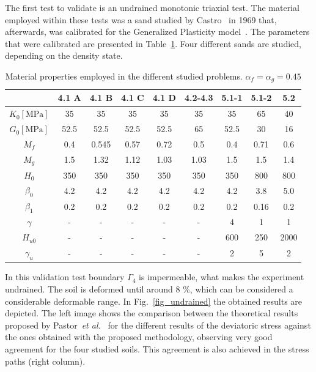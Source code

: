 \documentclass[preprint,12pt,a4paper]{elsarticle}
\begin{document}
The first test to validate is an undrained monotonic triaxial test. The material employed within these tests was a sand studied by Castro~\cite{Castro69} in 1969 that, afterwards, was calibrated for the Generalized Plasticity model~\cite{PastorZC:90,Zienkiewicz99}. The parameters that were calibrated are presented in Table~\ref{tab3}. Four different sands are studied, depending on the density state.

\begin{table}
\caption{\label{tab3} Material properties employed in the different studied problems. $\alpha_f=\alpha_g=0.45$} 
\centering
	\begin{tabular}{c|c|c|c|c|c|c|c|c}
	& 4.1 A  & 4.1 B & 4.1 C & 4.1 D & 4.2-4.3 & 5.1-1 & 5.1-2 & 5.2 \\
	\hline
        $K_{0} \left[ \text{MPa} \right]$  & 35 & 35 & 35 & 35 & 35 & 35 & 65 & 40
        \\ 
        $G_{0} \left[ \text{MPa} \right]$ & 52.5 & 52.5 & 52.5 & 52.5 & 65 & 52.5 & 30 & 16
        \\
        \(M_{f}\)  & 0.4 & 0.545 & 0.57 & 0.72 & 0.5 & 0.4 & 0.71 & 0.6
        \\
        \(M_{g}\) & 1.5 & 1.32 & 1.12 & 1.03 & 1.03 & 1.5 & 1.5 & 1.4
        \\
        \(H_{0}\) & 350 & 350 & 350 & 350 & 350  & 350 & 800 & 800
        \\
        \(\beta_{0}\) & 4.2 & 4.2 & 4.2 & 4.2 & 4.2 & 4.2 & 3.8 & 5.0
        \\
        \(\beta_{1}\) & 0.2 & 0.2 & 0.2 & 0.2 & 0.2 & 0.2 & 0.16 & 0.2
        \\
        \( \gamma\)  & - & - & - & - & - & 4 & 1 & 1
        \\
        \(H_{u 0}\) & - & - & - & - & - & 600 & 250 & 2000
        \\
        \( \gamma_{u}\)  & - & - & - & - & - & 2 & 5 & 2
        \\
	\end{tabular}
\end{table}

In this validation test boundary $\Gamma_4$ is impermeable, what makes the experiment undrained. The soil is deformed until around 8 \%, which can be considered a considerable deformable range. In Fig.~\ref{fig_undrained} the obtained results are depicted. The left image shows the comparison between the theoretical results proposed by Pastor~\textit{et al.}~\cite{PastorZC:90} for the different results of the deviatoric stress against the ones obtained with the proposed methodology, observing very good agreement for the four studied soils. This agreement is also achieved in the stress paths (right column).
\end{document}
